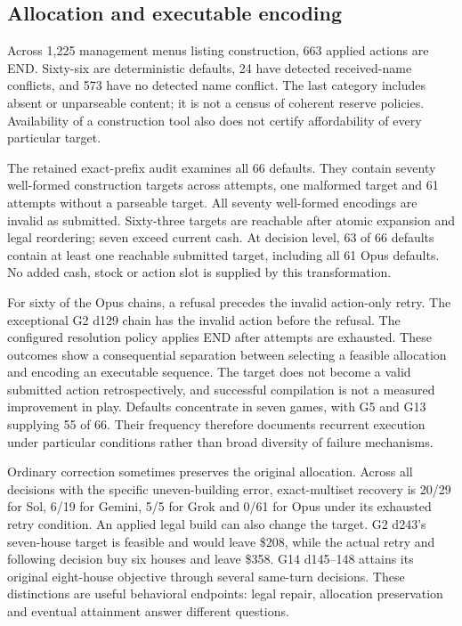 \documentclass[11pt,letterpaper]{article}
\begin{document}
\subsection{Allocation and executable encoding}

Across 1,225 management menus listing construction, 663 applied actions are END. Sixty-six are deterministic defaults, 24 have detected received-name conflicts, and 573 have no detected name conflict. The last category includes absent or unparseable content; it is not a census of coherent reserve policies. Availability of a construction tool also does not certify affordability of every particular target.

The retained exact-prefix audit examines all 66 defaults. They contain seventy well-formed construction targets across attempts, one malformed target and 61 attempts without a parseable target. All seventy well-formed encodings are invalid as submitted. Sixty-three targets are reachable after atomic expansion and legal reordering; seven exceed current cash. At decision level, 63 of 66 defaults contain at least one reachable submitted target, including all 61 Opus defaults. No added cash, stock or action slot is supplied by this transformation.

For sixty of the Opus chains, a refusal precedes the invalid action-only retry. The exceptional G2 d129 chain has the invalid action before the refusal. The configured resolution policy applies END after attempts are exhausted. These outcomes show a consequential separation between selecting a feasible allocation and encoding an executable sequence. The target does not become a valid submitted action retrospectively, and successful compilation is not a measured improvement in play. Defaults concentrate in seven games, with G5 and G13 supplying 55 of 66. Their frequency therefore documents recurrent execution under particular conditions rather than broad diversity of failure mechanisms.

Ordinary correction sometimes preserves the original allocation. Across all decisions with the specific uneven-building error, exact-multiset recovery is 20/29 for Sol, 6/19 for Gemini, 5/5 for Grok and 0/61 for Opus under its exhausted retry condition. An applied legal build can also change the target. G2 d243's seven-house target is feasible and would leave \$208, while the actual retry and following decision buy six houses and leave \$358. G14 d145--148 attains its original eight-house objective through several same-turn decisions. These distinctions are useful behavioral endpoints: legal repair, allocation preservation and eventual attainment answer different questions.
\end{document}
